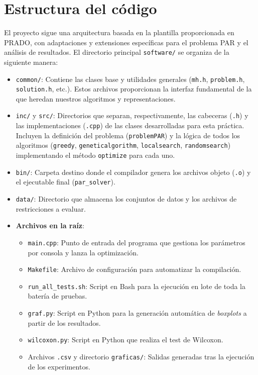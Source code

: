 \documentclass[a4paper,12pt]{article}%
\begin{document}
\newpage
\section{Estructura del código}

\noindent El proyecto sigue una arquitectura basada en la plantilla proporcionada en PRADO, con adaptaciones y extensiones específicas para el problema PAR y el análisis de resultados. El directorio principal \texttt{software/} se organiza de la siguiente manera:

\begin{itemize}
	\item \texttt{common/}: Contiene las clases base y utilidades generales (\texttt{mh.h}, \texttt{problem.h}, \texttt{solution.h}, etc.). Estos archivos proporcionan la interfaz fundamental de la que heredan nuestros algoritmos y representaciones.
	\item \texttt{inc/} y \texttt{src/}: Directorios que separan, respectivamente, las cabeceras (\texttt{.h}) y las implementaciones (\texttt{.cpp}) de las clases desarrolladas para esta práctica. Incluyen la definición del problema (\texttt{problemPAR}) y la lógica de todos los algoritmos (\texttt{greedy}, \texttt{geneticalgorithm}, \texttt{localsearch}, \texttt{randomsearch}) implementando el método \texttt{optimize} para cada uno.
	\item \texttt{bin/}: Carpeta destino donde el compilador genera los archivos objeto (\texttt{.o}) y el ejecutable final (\texttt{par\_solver}).
	\item \texttt{data/}: Directorio que almacena los conjuntos de datos y los archivos de restricciones a evaluar.
	\item \textbf{Archivos en la raíz}: 
	\begin{itemize}
		\item \texttt{main.cpp}: Punto de entrada del programa que gestiona los parámetros por consola y lanza la optimización.
		\item \texttt{Makefile}: Archivo de configuración para automatizar la compilación.
		\item \texttt{run\_all\_tests.sh}: Script en Bash para la ejecución en lote de toda la batería de pruebas.
		\item \texttt{graf.py}: Script en Python para la generación automática de \textit{boxplots} a partir de los resultados.
		\item \texttt{wilcoxon.py}: Script en Python que realiza el test de Wilcoxon.
		\item Archivos \texttt{.csv} y directorio \texttt{graficas/}: Salidas generadas tras la ejecución de los experimentos.
	\end{itemize}
\end{itemize}
\end{document}
